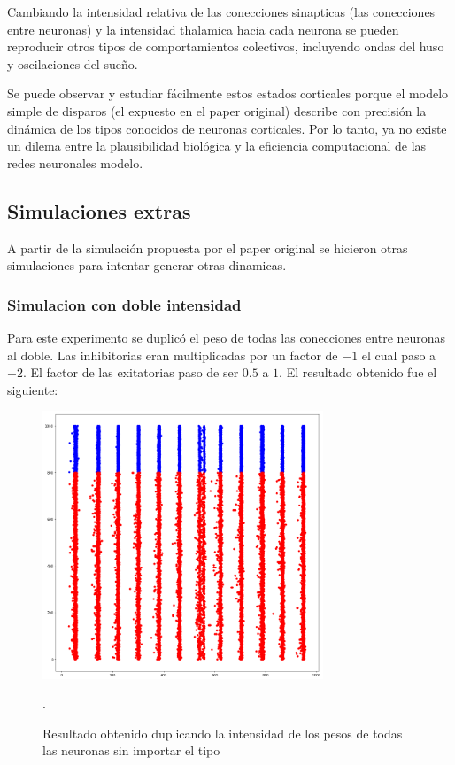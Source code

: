 \documentclass[12pt]{article}
\begin{document}
Cambiando la intensidad relativa de las conecciones sinapticas (las conecciones entre neuronas) y la intensidad thalamica hacia cada neurona se pueden reproducir otros tipos de comportamientos
colectivos, incluyendo ondas del huso y oscilaciones del sueño.

Se puede observar y estudiar fácilmente estos estados corticales porque el modelo simple de disparos (el expuesto en el paper original) describe con precisión la dinámica de los tipos conocidos
de neuronas corticales. Por lo tanto, ya no existe un dilema entre la plausibilidad biológica y la eficiencia computacional de las redes neuronales modelo.

\subsection{Simulaciones extras}
A partir de la simulación propuesta por el paper original se hicieron otras simulaciones para intentar generar otras dinamicas.

\subsubsection{Simulacion con doble intensidad}
Para este experimento se duplicó el peso de todas las conecciones entre neuronas al doble. Las inhibitorias eran multiplicadas por un factor de $-1$ el cual paso a $-2$.
El factor de las exitatorias paso de ser $0.5$ a $1$. El resultado obtenido fue el siguiente:

\begin{figure}[h!]
    \centering
        \includegraphics[height=8cm]{images/resultadoDobleAmbos.png}
    \caption[fontsize=2pt]{Resultado obtenido duplicando la intensidad de los pesos de todas las neuronas sin importar el tipo}.
\end{figure}
\end{document}
